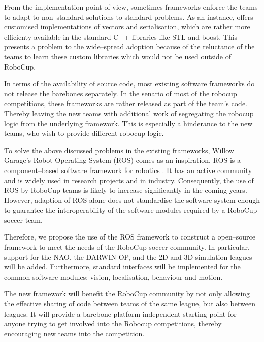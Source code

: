 \documentclass{llncs}
\begin{document}
From the implementation point of view, sometimes frameworks enforce the teams
to adapt to non--standard solutions to
standard problems. As an instance, \cite{Rofer2010b} offers customised
implementations of vectors and serialisation, which are rather more efficienty
available in the standard C++ libraries like STL and boost. This presents a
problem to the wide--spread adoption because of the reluctance of the teams to
learn these custom libraries which would not be used outside of RoboCup.

In terms of the availability of source code, most existing
software frameworks do not release the barebones separately. In the senario
of most of the robocup competitions, these frameworks are rather released as
part of the team's code. Thereby leaving the new teams with additional work of
segregating the robocup logic from the underlying framework. This is especially
a hinderance to the new teams, who wish to provide different robocup logic.

To solve the above discussed problems in the existing frameworks, Willow
Garage's Robot Operating System (ROS) comes as an inspiration. ROS is a
component--based software framework for robotics \cite{Quigley2009}. It has an
active community and is widely used in research projects and in industry.
Consequently, the use of ROS by RoboCup teams is likely to increase
significantly in the coming years. However, adaption of ROS alone does not
standardise the software system enough to guarantee the interoperability of the
software modules required by a RoboCup soccer team.

Therefore, we propose the use of the ROS framework to construct a open--source
framework to meet the needs of the RoboCup soccer community. In particular, support for
the NAO, the DARWIN-OP, and the 2D and 3D simulation leagues will be added.
Furthermore, standard interfaces will be implemented for the common software
modules; vision, localisation, behaviour and motion.

The new framework will benefit the RoboCup community by not only allowing the
effective sharing of code between teams of the same league, but also between
leagues. It will provide a barebone platform independent starting point for
anyone trying to get involved into the Robocup competitions, thereby
encouraging new teams into the competition. 




\end{document}
